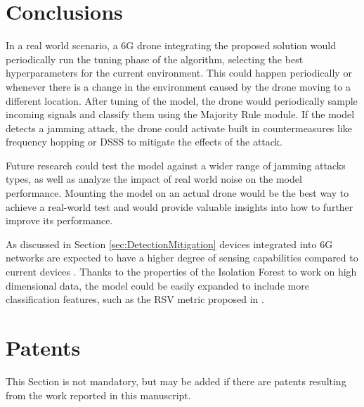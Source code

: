 \documentclass[futureinternet,article,submit,pdftex,moreauthors]{Definitions/mdpi}
\begin{document}
\section{Conclusions}

In a real world scenario, a 6G drone integrating the proposed solution would periodically run the tuning phase of the algorithm, selecting the best hyperparameters for the current environment. This could happen periodically or whenever there is a change in the environment caused by the drone moving to a different location. 
After tuning of the model, the drone would periodically sample incoming signals and classify them using the Majority Rule module. If the model detects a jamming attack, the drone could activate built in countermeasures like frequency hopping or DSSS to mitigate the effects of the attack. 

Future research could test the model against a wider range of jamming attacks types, as well as analyze the impact of real world noise on the model performance.
Mounting the model on an actual drone would be the best way to achieve a real-world test and would provide valuable insights into how to further improve its performance.

As discussed in Section \ref{sec:DetectionMitigation} devices integrated into 6G networks are expected to have a higher degree of sensing capabilities compared to current devices \cite{6GRoadmapLetaief}. Thanks to the properties of the Isolation Forest to work on high dimensional data, the model could be easily expanded to include more classification features, such as the RSV metric proposed in \cite{JammingDetectionIoT-Hussain}.


\section{Patents}

This Section is not mandatory, but may be added if there are patents resulting from the work reported in this manuscript.

\vspace{6pt} 
\end{document}
